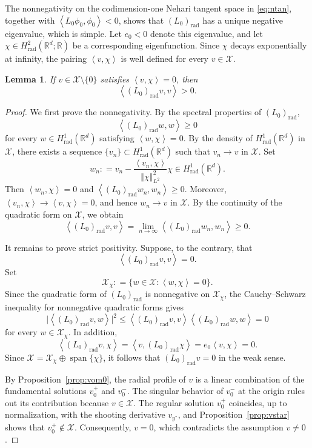 \documentclass[12pt, a4paper, reqno]{amsart}
\numberwithin{equation}{section}
\newtheorem{lemma}[theorem]{Lemma}
\theoremstyle{definition}
\theoremstyle{remark}
\newcommand{\R}{\mathbb R}
\newcommand{\scX}{\mathscr X}
\def\tbra[#1,#2]{{\left\langle #1,#2\right\rangle}}
\def\norm[#1]{{\left\Vert #1 \right\Vert}}
\newcommand{\rad}{\mathrm{rad}}
\newcommand{\ce}{\mathrel{\mathop:}=}
\begin{document}
The nonnegativity on the codimension-one Nehari tangent space in
\eqref{eq:ntan}, together with $\tbra[L_0\phi_0,\phi_0]<0$,
shows that $(L_0)_{\rad}$ has a unique negative eigenvalue,
which is simple.
Let $e_0<0$ denote this eigenvalue, and let
$\chi\in H^2_{\rad}(\R^d;\R)$ be a corresponding eigenfunction.
Since $\chi$ decays exponentially at infinity, the pairing $\tbra[v,\chi]$ is well
defined for every $v\in \scX$.

\begin{lemma}%
\label{lem:pos}
If $v\in \scX\setminus\{0\}$ satisfies $\tbra[v,\chi]=0$, then
\[
  \tbra[(L_0)_{\rad}v,v]>0.
\]
\end{lemma}

\begin{proof}
We first prove the nonnegativity. By the spectral properties of
$(L_0)_{\rad}$,
\[
  \tbra[(L_0)_{\rad}w,w]\ge0
\]
for every $w\in H^1_{\rad}(\R^d)$ satisfying $\tbra[w,\chi]=0$.
By the density of $H^1_{\rad}(\R^d)$ in $\scX$, there exists a sequence
$\{v_n\}\subset H^1_{\rad}(\R^d)$ such that $v_n\to v$ in $\scX$. Set
\[
  w_n
  \ce v_n-\frac{\tbra[v_n,\chi]}{\norm[\chi]_{L^2}^2}\chi
  \in H^1_{\rad}(\R^d).
\]
Then $\tbra[w_n,\chi]=0$ and
$\tbra[(L_0)_{\rad}w_n,w_n]\ge0$. Moreover,
$\tbra[v_n,\chi]\to\tbra[v,\chi]=0$, and hence $w_n\to v$ in $\scX$.
By the continuity of the quadratic form on $\scX$, we obtain
\[
  \tbra[(L_0)_{\rad}v,v]
  =\lim_{n\to\infty}\tbra[(L_0)_{\rad}w_n,w_n]
  \ge0.
\]

It remains to prove strict positivity. Suppose, to the contrary, that
\[
  \tbra[(L_0)_{\rad}v,v]=0.
\]
Set
\[
  \scX_\chi
  \ce\bigl\{w\in \scX:\tbra[w,\chi]=0\bigr\}.
\]
Since the quadratic form of $(L_0)_{\rad}$ is nonnegative on $\scX_\chi$, the
Cauchy--Schwarz inequality for nonnegative quadratic forms gives
\[
  \bigl|\tbra[(L_0)_{\rad}v,w]\bigr|^2
  \le
  \tbra[(L_0)_{\rad}v,v]
  \tbra[(L_0)_{\rad}w,w]
  =0
\]
for every $w\in \scX_\chi$. In addition,
\[
  \tbra[(L_0)_{\rad}v,\chi]
  =\tbra[v,(L_0)_{\rad}\chi]
  =e_0\tbra[v,\chi]
  =0.
\]
Since $\scX=\scX_\chi\oplus\operatorname{span}\{\chi\}$, it follows that
$(L_0)_{\rad}v=0$ in the weak sense.

By Proposition~\ref{prop:vom0}, the radial profile of $v$ is a linear
combination of the fundamental solutions $v_0^+$ and $v_0^-$. The singular
behavior of $v_0^-$ at the origin rules out its contribution because
$v\in \scX$. The regular solution $v_0^+$ coincides, up to normalization, with
the shooting derivative $v_{y^*}$, and
Proposition~\ref{prop:vstar} shows that $v_0^+\notin \scX$.
Consequently, $v=0$, which contradicts the assumption $v\ne0$.
\end{proof}
\end{document}
